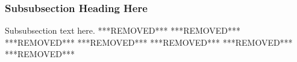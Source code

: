 \documentclass[10pt, journal, twocolumn]{IEEEtran}
\begin{document}
\subsubsection{Subsubsection Heading Here}
Subsubsection text here.
***REMOVED***
***REMOVED***
%
%
***REMOVED***
***REMOVED***
***REMOVED***
%
%
***REMOVED***
***REMOVED***
\end{document}
